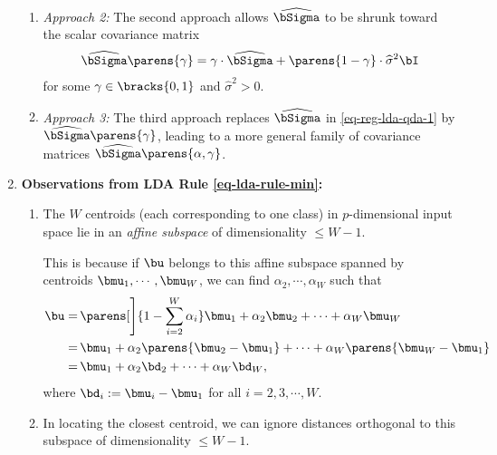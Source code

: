 \documentclass[12pt]{article}
\begin{document}
\begin{enumerate}[label=\textbf{\arabic*.}]
\begin{enumerate}
		\item \textit{Approach 2:} The second approach allows $\widehat{\bSigma}$ to be shrunk toward the scalar covariance matrix 
		\begin{align}\label{eq-reg-lda-qda-2}
			\widehat{\bSigma} \parens{\gamma} = \gamma \cdot \widehat{\bSigma} + \parens{1-\gamma} \cdot \widehat{\sigma}^2 \bI
		\end{align}
		for some $\gamma \in \bracks{0, 1}$ and $\widehat{\sigma}^2 > 0$. 
		
		\item \textit{Approach 3:} The third approach replaces $\widehat{\bSigma}$ in \eqref{eq-reg-lda-qda-1} by $\widehat{\bSigma} \parens{\gamma}$, leading to a more general family of covariance matrices $\widehat{\bSigma} \parens{\alpha, \gamma}$. 
	\end{enumerate}
	
	\item \textbf{Observations from LDA Rule \eqref{eq-lda-rule-min}:}
	\begin{enumerate}
		\item The $W$ centroids (each corresponding to one class) in $p$-dimensional input space lie in an \emph{affine subspace} of dimensionality $\le W - 1$. 
		
		This is because if $\bu$ belongs to this affine subspace spanned by centroids $\bmu_1, \cdots, \bmu_W$, we can find $\alpha_2, \cdots, \alpha_{W}$ such that  
		\begin{align*}
			\bu = & \, \parens[\Bigg]{1 - \sum_{i=2}^{W} \alpha_i} \bmu_1 + \alpha_2 \bmu_2 + \cdots + \alpha_W \bmu_W \\ 
			= & \, \bmu_1 + \alpha_2 \parens{\bmu_2 - \bmu_1} + \cdots + \alpha_W \parens{\bmu_W - \bmu_1} \\ 
			= & \, \bmu_1 + \alpha_2 \bd_2 + \cdots + \alpha_W \bd_W, 
		\end{align*}
		where $\bd_i := \bmu_i - \bmu_1$ for all $i = 2, 3, \cdots, W$. 
		
		\item In locating the closest centroid, we can ignore distances orthogonal to this subspace of dimensionality $\le W - 1$. 
		

\end{enumerate}
\end{enumerate}
\end{document}
